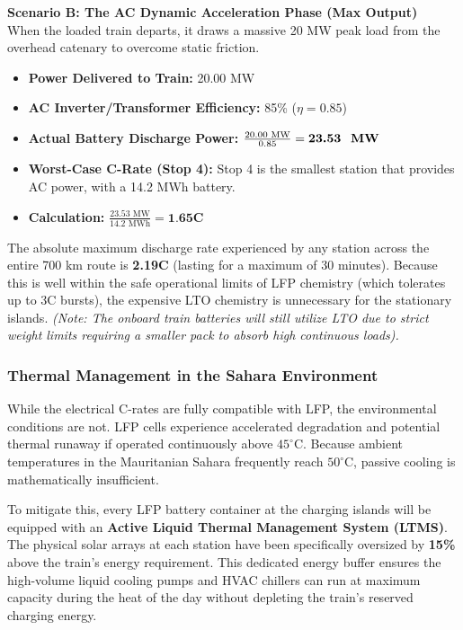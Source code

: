 \vspace{0.5em}
\noindent\textbf{Scenario B: The AC Dynamic Acceleration Phase (Max Output)} \\
When the loaded train departs, it draws a massive 20 MW peak load from the overhead catenary to overcome static friction.
\begin{itemize}
    \item \textbf{Power Delivered to Train:} 20.00 MW
    \item \textbf{AC Inverter/Transformer Efficiency:} 85\% ($\eta = 0.85$)
    \item \textbf{Actual Battery Discharge Power:} $\frac{20.00 \text{ MW}}{0.85} = \textbf{23.53 \text{ MW}}$
    \item \textbf{Worst-Case C-Rate (Stop 4):} Stop 4 is the smallest station that provides AC power, with a 14.2 MWh battery.
    \item \textbf{Calculation:} $\frac{23.53 \text{ MW}}{14.2 \text{ MWh}} = \textbf{1.65C}$
\end{itemize}

The absolute maximum discharge rate experienced by any station across the entire 700 km route is \textbf{2.19C} (lasting for a maximum of 30 minutes). Because this is well within the safe operational limits of LFP chemistry (which tolerates up to 3C bursts), the expensive LTO chemistry is unnecessary for the stationary islands. \textit{(Note: The onboard train batteries will still utilize LTO due to strict weight limits requiring a smaller pack to absorb high continuous loads).}

\subsubsection*{Thermal Management in the Sahara Environment}
While the electrical C-rates are fully compatible with LFP, the environmental conditions are not. LFP cells experience accelerated degradation and potential thermal runaway if operated continuously above $45^\circ$C. Because ambient temperatures in the Mauritanian Sahara frequently reach $50^\circ$C, passive cooling is mathematically insufficient.

To mitigate this, every LFP battery container at the charging islands will be equipped with an \textbf{Active Liquid Thermal Management System (LTMS)}.
The physical solar arrays at each station have been specifically oversized by \textbf{15\%} above the train's energy requirement. This dedicated energy buffer ensures the high-volume liquid cooling pumps and HVAC chillers can run at maximum capacity during the heat of the day without depleting the train's reserved charging energy.

